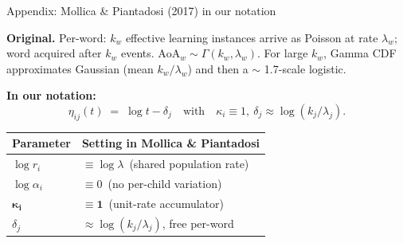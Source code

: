 \documentclass[
  ignorenonframetext,
  aspectratio=169,
  t]{beamer}
\renewcommand{\arraystretch}{1.10}
\begin{document}
\begin{frame}{Appendix: Mollica \& Piantadosi (2017) in our notation}
\label{appendix-mollica-piantadosi-2017-in-our-notation}
\small

\textbf{Original.} Per-word: \(k_w\) effective learning instances arrive
as Poisson at rate \(\lambda_w\); word acquired after \(k_w\) events.
\(\mathrm{AoA}_w \sim \Gamma(k_w, \lambda_w)\). For large \(k_w\), Gamma
CDF approximates Gaussian (mean \(k_w/\lambda_w\)) and then a \(\sim\)
1.7-scale logistic.

\vspace{0.6em}
\centering

\textbf{In our notation:} \[
\eta_{ij}(t) \;=\; \log t - \delta_j
\quad\text{with}\quad \kappa_i \equiv 1,\ \delta_j \approx \log(k_j/\lambda_j).
\]

\vspace{0.4em}
\renewcommand{\arraystretch}{1.20}
\begin{tabular}{@{}ll@{}}
\toprule
\textbf{Parameter} & \textbf{Setting in Mollica \& Piantadosi} \\
\midrule
$\log r_i$         & $\equiv \log \lambda$ \,(shared population rate) \\
$\log\alpha_i$     & $\equiv 0$ \,(no per-child variation) \\
$\boldsymbol{\kappa_i}$ & $\boldsymbol{\equiv 1}$ \,(unit-rate accumulator) \\
$\delta_j$         & $\approx \log(k_j/\lambda_j)$, free per-word \\
\bottomrule
\end{tabular}
\end{frame}
\end{document}
